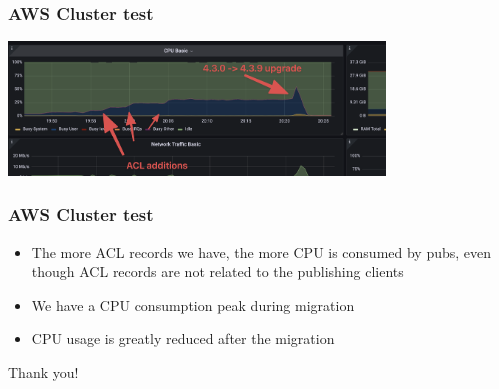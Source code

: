 \documentclass{beamer}
\begin{document}
\begin{frame}
    \frametitle{AWS Cluster test}

    \begin{center}
        \includegraphics[width=10cm, keepaspectratio]{images/optimized-cluster.png}
    \end{center}
\end{frame}

\begin{frame}
    \frametitle{AWS Cluster test}

    \begin{itemize}
        \item The more ACL records we have, the more CPU is consumed by pubs,
            even though ACL records are not related to the publishing clients
        \item We have a CPU consumption peak during migration
        \item CPU usage is greatly reduced after the migration
    \end{itemize}
\end{frame}

\begin{frame}
    \begin{center}
        Thank you!
    \end{center}
\end{frame}
\end{document}
